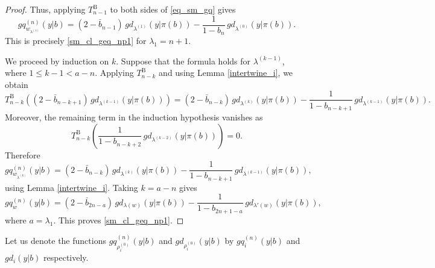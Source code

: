 \documentclass[a4paper]{amsart}
\theoremstyle{remark}
\numberwithin{equation}{section}
\begin{document}
\begin{proof}
Thus, applying $T_{n-1}^{\mathrm{B}}$ to both sides of \eqref{eq_sm_gq} gives
\[
    gq_{w_{\lambda^{(1)}}}^{(n)}(y| b)
    =
    (2-\bar{b}_{n-1})\,
    gd_{\lambda^{(1)}}(y| \pi(b))
    -
    \frac{1}{1-b_n}\,
    gd_{\lambda^{(0)}}(y| \pi(b)).
\]
This is precisely \eqref{sm_cl_geq_np1} for $\lambda_1=n+1$.

We proceed by induction on $k$. Suppose that the formula holds for
$\lambda^{(k-1)}$, where $1\leq k-1<a-n$. Applying
$T_{n-k}^{\mathrm{B}}$ and using Lemma \ref{intertwine_i}, we obtain
\[
    T_{n-k}^{\mathrm{B}}
    \left(
        (2-\bar{b}_{n-k+1})\,
        gd_{\lambda^{(k-1)}}(y| \pi(b))
    \right)
    =
    (2-\bar{b}_{n-k})\,
    gd_{\lambda^{(k)}}(y| \pi(b))
    -
    \frac{1}{1-b_{n-k+1}}\,
    gd_{\lambda^{(k-1)}}(y| \pi(b)).
\]
Moreover, the remaining term in the induction hypothesis vanishes as
\[
    T_{n-k}^{\mathrm{B}}
    \left(
        \frac{1}{1-b_{n-k+2}}\,
        gd_{\lambda^{(k-2)}}(y| \pi(b))
    \right)
    =0.
\]
Therefore
\[
    gq_{w_{\lambda^{(k)}}}^{(n)}(y| b)
    =
    (2-\bar{b}_{n-k})\,
    gd_{\lambda^{(k)}}(y| \pi(b))
    -
    \frac{1}{1-b_{n-k+1}}\,
    gd_{\lambda^{(k-1)}}(y| \pi(b)),
\]
using Lemma \ref{intertwine_i}.
Taking $k=a-n$ gives
\[
    gq_w^{(n)}(y| b)
    =
    (2-\bar{b}_{2n-a})\,
    gd_{\lambda(w)}(y| \pi(b))
    -
    \frac{1}{1-b_{2n+1-a}}\,
    gd_{\lambda'(w)}(y| \pi(b)),
\]
where $a=\lambda_1$. This proves \eqref{sm_cl_geq_np1}.
\end{proof}



















Let us denote the functions $gq_{\rho_i^{(0)}}^{(n)}(y| b)$ and $gd_{\rho_i^{(0)}}(y| b)$ by $gq_{i}^{(n)}(y| b)$ and $gd_{i}(y| b)$ respectively.
\end{document}
